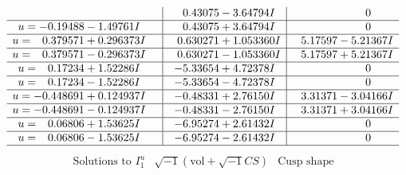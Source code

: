 \documentclass[1p]{elsarticle_modified}
\theoremstyle{definition}
\newcommand{\I}{\sqrt{-1}}
\begin{document}
$$\begin{array}{c|c|c}
 & \phantom{-}0.43075 - 3.64794 I & \phantom{-0.000000 } 0 \\ \hline\begin{aligned}
u &= -0.19488 - 1.49761 I\end{aligned}
 & \phantom{-}0.43075 + 3.64794 I & \phantom{-0.000000 } 0 \\ \hline\begin{aligned}
u &= \phantom{-}0.379571 + 0.296373 I\end{aligned}
 & \phantom{-}0.630271 + 1.053360 I & \phantom{-}5.17597 - 5.21367 I \\ \hline\begin{aligned}
u &= \phantom{-}0.379571 - 0.296373 I\end{aligned}
 & \phantom{-}0.630271 - 1.053360 I & \phantom{-}5.17597 + 5.21367 I \\ \hline\begin{aligned}
u &= \phantom{-}0.17234 + 1.52286 I\end{aligned}
 & -5.33654 + 4.72378 I & \phantom{-0.000000 } 0 \\ \hline\begin{aligned}
u &= \phantom{-}0.17234 - 1.52286 I\end{aligned}
 & -5.33654 - 4.72378 I & \phantom{-0.000000 } 0 \\ \hline\begin{aligned}
u &= -0.448691 + 0.124937 I\end{aligned}
 & -0.48331 + 2.76150 I & \phantom{-}3.31371 - 3.04166 I \\ \hline\begin{aligned}
u &= -0.448691 - 0.124937 I\end{aligned}
 & -0.48331 - 2.76150 I & \phantom{-}3.31371 + 3.04166 I \\ \hline\begin{aligned}
u &= \phantom{-}0.06806 + 1.53625 I\end{aligned}
 & -6.95274 + 2.61432 I & \phantom{-0.000000 } 0 \\ \hline\begin{aligned}
u &= \phantom{-}0.06806 - 1.53625 I\end{aligned}
 & -6.95274 - 2.61432 I & \phantom{-0.000000 } 0\\
 \hline 
 \end{array}$$\newpage$$\begin{array}{c|c|c}  
\text{Solutions to }I^u_{1}& \I (\text{vol} + \sqrt{-1}CS) & \text{Cusp shape}\\
 \hline 
\begin{aligned}

\end{aligned}
\end{array}$$
\end{document}
